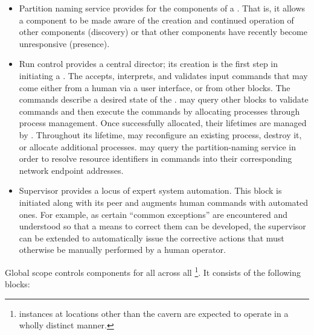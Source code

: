 \begin{itemize}
\item Partition naming service provides  for the components of a . 
  That is, it allows a component to be made aware  of the creation and continued operation of other components (discovery) or that other components have recently become unresponsive (presence). 

\item Run control provides a central director;  its creation is the first step in initiating a . 
  The  accepts, interprets, and validates input commands that may come either from a human via a user interface, or from other blocks. 
  The commands describe a desired state of the . 
   may query other blocks to validate commands and then execute the commands by allocating processes through process management. 
  Once successfully allocated, their lifetimes are managed by . 
  Throughout its lifetime,  may reconfigure an existing process, destroy it, or allocate additional processes. 
   may query the partition-naming service in order to resolve resource identifiers in commands into their corresponding network endpoint addresses.  

\item Supervisor provides a locus of expert system automation. 
  This block is initiated along with its  peer and augments human commands with automated ones. 
  For example, as certain ``common exceptions'' are encountered and understood so that a means to correct them can be developed, the supervisor can be extended to automatically issue the corrective actions that must otherwise be manually performed by a human operator.

\end{itemize}

Global scope controls  components for all  across all \footnote{ instances at locations other than the  cavern are expected to operate in a wholly distinct manner.}.  It consists of the following blocks:



